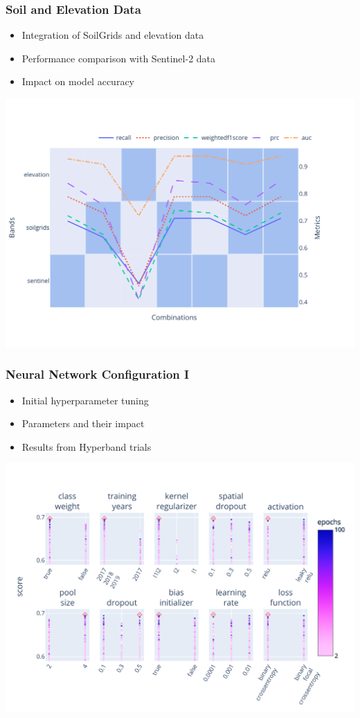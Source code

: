 \documentclass[compress]{beamer}
\begin{document}
\begin{frame}
\frametitle{Soil and Elevation Data}
\begin{itemize}
    \item Integration of SoilGrids and elevation data
    \item Performance comparison with Sentinel-2 data
    \item Impact on model accuracy
\end{itemize}
\includegraphics[width=0.9\linewidth, trim={20pt 40pt 10pt 30pt}, clip]{../report/figures/figures_analysis/soil_elevation_analysis.pdf}
\end{frame}

\begin{frame}
\frametitle{Neural Network Configuration I}
\begin{itemize}
    \item Initial hyperparameter tuning
    \item Parameters and their impact
    \item Results from Hyperband trials
\end{itemize}
\includegraphics[width=0.9\linewidth, trim={10pt 10pt 15pt 40pt}, clip]{../report/figures/figures_tuner/hyperband_resnet_params.pdf}
\end{frame}
\end{document}
